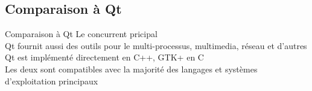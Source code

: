 \documentclass{beamer}
\begin{document}
  \subsection{Comparaison à Qt}
  \begin{frame}{Comparaison à Qt}
    Le concurrent pricipal\\
    Qt fournit aussi des outils pour le multi-processus, multimedia, réseau et d'autres\\
    Qt est implémenté directement en C++, GTK+ en C\\
    Les deux sont compatibles avec la majorité des langages et systèmes d'exploitation principaux
  \end{frame}
\end{document}
